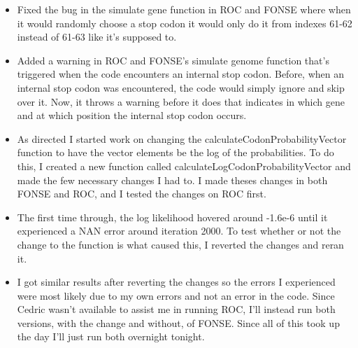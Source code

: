 \documentclass[11pt]{labbook}
\begin{document}
    \begin{itemize}
        \item Fixed the bug in the simulate gene function in ROC and FONSE where when it would randomly choose a stop codon it would only do it from indexes 61-62 instead of 61-63 like it's supposed to.
        \item Added a warning in ROC and FONSE's simulate genome function that's triggered when the code encounters an internal stop codon. Before, when an internal stop codon was encountered, the code would simply ignore and skip over it. Now, it throws a warning before it does that indicates in which gene and at which position the internal stop codon occurs.
        \item As directed I started work on changing the calculateCodonProbabilityVector function to have the vector elements be the log of the probabilities. To do this, I created a new function called calculateLogCodonProbabilityVector and made the few necessary changes I had to. I made theses changes in both FONSE and ROC, and I tested the changes on ROC first. 
        \item The first time through, the log likelihood hovered around -1.6e-6 until it experienced a NAN error around iteration 2000. To test whether or not the change to the function is what caused this, I reverted the changes and reran it.
        \item I got similar results after reverting the changes so the errors I experienced were most likely due to my own errors and not an error in the code. Since Cedric wasn't available to assist me in running ROC, I'll instead run both versions, with the change and without, of FONSE. Since all of this took up the day I'll just run both overnight tonight.
    \end{itemize}
\end{document}
